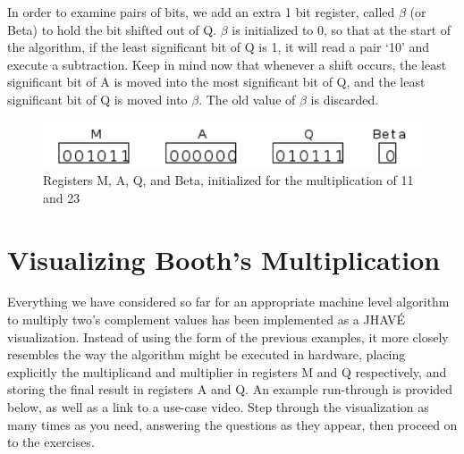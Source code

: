 \documentclass{article}
\begin{document}
    In order to examine pairs of bits, we add an extra 1 bit register, called $\beta$ (or Beta) to hold the bit shifted out of Q.
$\beta$ is initialized to 0, so that at the start of the algorithm, if the least significant bit of Q is 1, it will read a pair `10' and execute a subtraction.
Keep in mind now that whenever a shift occurs, the least significant bit of A is moved into the most significant bit of Q, and the least significant bit of Q is moved into $\beta$.
The old value of $\beta$ is discarded.

\begin{figure}[h]
\centering
\includegraphics{init2.pdf}
\caption{Registers M, A, Q, and Beta, initialized for the multiplication of 11 and 23}
\end{figure}

\section{Visualizing Booth's Multiplication}
Everything we have considered so far for an appropriate machine level algorithm to multiply two's complement values has been implemented as a JHAVÉ visualization.
Instead of using the form of the previous examples, it more closely resembles the way the algorithm might be executed in hardware, placing explicitly the multiplicand and multiplier in registers M and Q respectively, and storing the final result in registers A and Q.
An example run-through is provided below, as well as a link to a use-case video.
Step through the visualization as many times as you need, answering the questions as they appear, then proceed on to the exercises.

\end{document}
